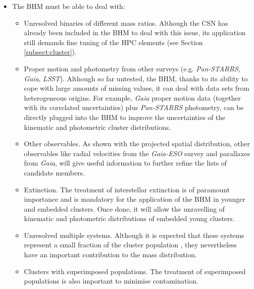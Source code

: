 \begin{itemize}
\item The BHM must be able to deal with:
\begin{itemize}
\item Unresolved binaries of different mass ratios. Although the CSN has already been included in the BHM to deal with this issue, its application still demands fine tuning of the HPC elements (see Section \ref{subsect:cluster}).
\item Proper motion and photometry from other surveys (e.g. \emph{Pan-STARRS}, \emph{Gaia}, \emph{LSST}). Although so far untested, the BHM, thanks to its ability to cope with large amounts of missing values, it can deal with data sets from heterogeneous origins. For example, \emph{Gaia} proper motion data (together with its correlated uncertainties) plus \emph{Pan-STARRS} photometry, can be directly plugged into the BHM to improve the uncertainties of the kinematic and photometric cluster distributions. 
\item Other observables. As shown with the projected spatial distribution, other observables like radial velocities from the \emph{Gaia-ESO} survey and parallaxes from \emph{Gaia}, will give useful information to further refine the lists of candidate members.
\item Extinction. The treatment of interstellar extinction is of paramount importance and is mandatory for the application of the BHM in younger and embedded clusters. Once done, it will allow the unravelling of kinematic and photometric distributions of embedded young clusters.

\item Unresolved multiple systems. Although it is expected that these systems represent a small fraction of the cluster population \cite[only 4\% for the triple systems][]{Duquennoy1991}, they nevertheless have an important contribution to the mass distribution. 

\item Clusters with superimposed populations. The treatment of superimposed populations is also important to minimise contamination.


\end{itemize}
\end{itemize}
